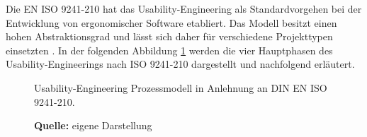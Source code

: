 Die EN ISO 9241-210 hat das Usability-Engineering als Standardvorgehen bei der Entwicklung von ergonomischer Software etabliert. Das Modell besitzt einen hohen Abstraktionsgrad und lässt sich daher für verschiedene Projekttypen einsetzten \citep[vgl.][21]{Ecker2015}. In der folgenden Abbildung \ref{fig:usabilityEngineeringVorgehensmodell} werden die vier Hauptphasen des Usability-Engineerings nach ISO 9241-210 dargestellt und nachfolgend erläutert.
\begin{figure}[H]
  \centering
  \caption{Usability-Engineering Prozessmodell in Anlehnung an DIN EN ISO 9241-210.}
  \caption*{\textbf{Quelle:} eigene Darstellung}
  \label{fig:usabilityEngineeringVorgehensmodell}
\end{figure}
